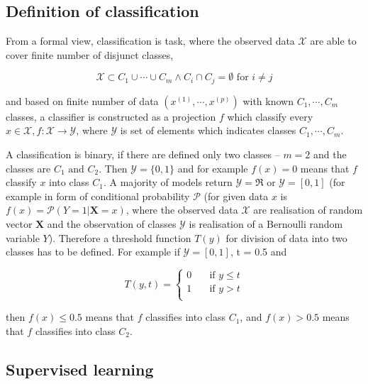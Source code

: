 \documentclass[thesis=M,english]{FITthesis}[2012/10/20]
\begin{document}
\subsection{Definition of classification}\label{sec:definitions}

From a formal view, classification is task, where the observed data $\mathcal{X}$ are able to cover finite number of disjunct classes,

\begin{equation}\label{eq:classification}
\mathcal{X} \subset C_1 \cup \cdots \cup C_m \land C_i \cap C_j = \emptyset \text{ for } i \neq j
\end{equation}

\noindent and based on finite number of data $(x^{(1)}, \cdots, x^{(p)})$ with known $C_1, \cdots, C_m$ classes, a classifier is constructed as a projection $f$ which classify every $x \in \mathcal{X}, f: \mathcal{X} \rightarrow \mathcal{Y}$, where $\mathcal{Y}$ is set of elements which indicates classes $C_1, \cdots, C_m$. \cite[6-8]{Bradley1999datamining}

A classification is binary, if there are defined only two classes -- $m = 2$ and the classes are $C_1 \text{ and } C_2$. Then $\mathcal{Y} = \lbrace0, 1\rbrace$ and for example $f(x) = 0$ means that $f$ classify $x$ into class $C_1$. A majority of models return $\mathcal{Y} = \Re$  or $\mathcal{Y} = [0, 1]$ (for example in form of conditional probability $\mathcal{P}$ (for given data $x$ is $f(x) = \mathcal{P}(Y = 1| \mathbf{X} = x)$, where the observed data $\mathcal{X}$ are realisation of random vector $\mathbf{X}$ and the observation of classes $\mathcal{Y}$ is realisation of a Bernoulli random variable $Y$).\cite[2]{Buja2005lossfunc} Therefore a threshold function $T(y)$ for division of data into two classes has to be defined. For example if $\mathcal{Y} = [0, 1]$, t = 0.5 and

\begin{equation}\label{eq:threshold}
T(y,t) =
  \begin{cases}
    0       & \quad \text{if } y \leq t\\
    1       & \quad \text{if } y > t\\
  \end{cases}
\end{equation}

\noindent then $f(x) \leq 0.5$ means that $f$ classifies into class $C_1$, and $f(x) > 0.5$ means that $f$ classifies into class $C_2$. 

\subsection{Supervised learning}
\end{document}
